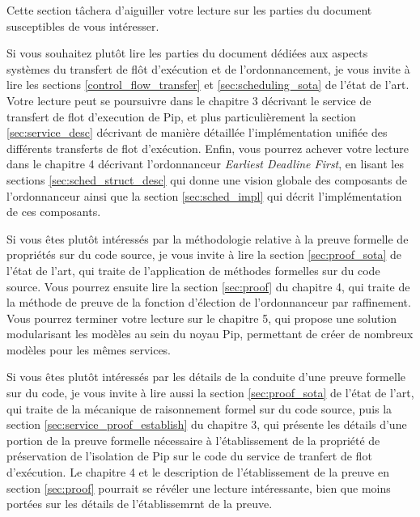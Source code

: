 Cette section tâchera d'aiguiller votre lecture sur les parties du document susceptibles de vous intéresser.

Si vous souhaitez plutôt lire les parties du document dédiées aux aspects systèmes du transfert de flôt d'exécution et de l'ordonnancement, je vous invite à lire les sections \ref{control_flow_transfer} et \ref{sec:scheduling_sota} de l'état de l'art. Votre lecture peut se poursuivre dans le chapitre 3 décrivant le service de transfert de flot d'execution de Pip, et plus particulièrement la section \ref{sec:service_desc} décrivant de manière détaillée l'implémentation unifiée des différents transferts de flot d'exécution. Enfin, vous pourrez achever votre lecture dans le chapitre 4 décrivant l'ordonnanceur \emph{Earliest Deadline First}, en lisant les sections \ref{sec:sched_struct_desc} qui donne une vision globale des composants de l'ordonnanceur ainsi que la section \ref{sec:sched_impl} qui décrit l'implémentation de ces composants.

Si vous êtes plutôt intéressés par la méthodologie relative à la preuve formelle de propriétés sur du code source, je vous invite à lire la section \ref{sec:proof_sota} de l'état de l'art, qui traite de l'application de méthodes formelles sur du code source. Vous pourrez ensuite lire la section \ref{sec:proof} du chapitre 4, qui traite de la méthode de preuve de la fonction d'élection de l'ordonnanceur par raffinement. Vous pourrez terminer votre lecture sur le chapitre 5, qui propose une solution modularisant les modèles au sein du noyau Pip, permettant de créer de nombreux modèles pour les mêmes services.

Si vous êtes plutôt intéressés par les détails de la conduite d'une preuve formelle sur du code, je vous invite à lire aussi la section \ref{sec:proof_sota} de l'état de l'art, qui traite de la mécanique de raisonnement formel sur du code source, puis la section \ref{sec:service_proof_establish} du chapitre 3, qui présente les détails d'une portion de la preuve formelle nécessaire à l'établissement de la propriété de préservation de l'isolation de Pip sur le code du service de tranfert de flot d'exécution. Le chapitre 4 et le description de l'établissement de la preuve en section \ref{sec:proof} pourrait se révéler une lecture intéressante, bien que moins portées sur les détails de l'établissemrnt de la preuve.
